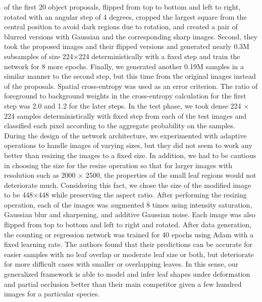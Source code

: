 of the first 20 object proposals, flipped from top to bottom and left to right, rotated with an angular step of 4 degrees, cropped the largest square from the central
position to avoid dark regions due to rotation, and created a pair of blurred versions with Gaussian and the corresponding sharp images. Second, they took the proposed
images and their flipped versions and generated nearly 0.3M subsamples of size 224×224 deterministically with a fixed step and train the network for 8 more epochs.
Finally, we generated another 0.19M samples in a similar manner to the second step, but this time from the original images instead of the proposals. Spatial
cross-entropy was used as an error criterion. The ratio of foreground to background weights in the cross-entropy calculation for the first step was 2.0 and 1.2
for the later steps. In the test phase, we took dense 224 × 224 samples deterministically with fixed step from each of the test images and classified each pixel
according to the aggregate probability on the samples. During the design of the network architecture, we experimented with adaptive operations to handle images
of varying sizes, but they did not seem to work any better than resizing the images to a fixed size. In addition, we had to be cautious in choosing the size for
the resize operation so that for larger images with resolution such as 2000 × 2500, the properties of the small leaf regions would not deteriorate much. Considering
this fact, we chose the size of the modified image to be 448×448 while preserving the aspect ratio. After performing the resizing operation, each of the images was
augmented 8 times using intensity saturation, Gaussian blur and sharpening, and additive Gaussian noise. Each image was also flipped from top to bottom and left to
right and rotated. After data generation, the counting or regression network was trained for 40 epochs using Adam with a fixed learning rate. The authors found that
their predictions can be accurate for easier samples with no leaf overlap or moderate leaf size or both, but deteriorate for more difficult cases with smaller or overlapping
leaves. In this sense, our generalized framework is able to model and infer leaf shapes under deformation and partial occlusion better than their main competitor given a
few hundred images for a particular species.

